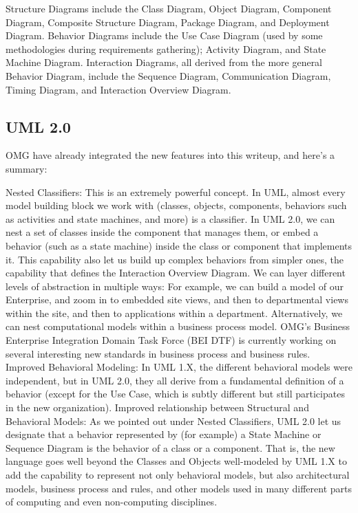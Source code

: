 Structure Diagrams include the Class Diagram, Object Diagram, Component Diagram, Composite Structure Diagram, Package Diagram, and Deployment Diagram. 
Behavior Diagrams include the Use Case Diagram (used by some methodologies during requirements gathering); Activity Diagram, and State Machine Diagram. 
Interaction Diagrams, all derived from the more general Behavior Diagram, include the Sequence Diagram, Communication Diagram, Timing Diagram, and 
Interaction Overview Diagram.

\subsection{UML 2.0}
\label{subsec:subsec01}
OMG have already integrated the new features into this writeup, and here's a summary: 

Nested Classifiers: This is an extremely powerful concept. In UML, almost every model building block we work with (classes, objects, components, 
behaviors such as activities and state machines, and more) is a classifier. In UML 2.0, we can nest a set of classes inside the component that manages 
them, or embed a behavior (such as a state machine) inside the class or component that implements it. This capability also let us build up complex behaviors 
from simpler ones, the capability that defines the Interaction Overview Diagram. We can layer different levels of abstraction in multiple ways: 
For example, we can build a model of our Enterprise, and zoom in to embedded site views, and then to departmental views within the site, 
and then to applications within a department. Alternatively, we can nest computational models within a business process model. 
OMG's Business Enterprise Integration Domain Task Force (BEI DTF) is currently working on several interesting new standards in business process 
and business rules. 
Improved Behavioral Modeling: In UML 1.X, the different behavioral models were independent, but in UML 2.0, they all derive from a fundamental 
definition of a behavior (except for the Use Case, which is subtly different but still participates in the new organization). 
Improved relationship between Structural and Behavioral Models: As we pointed out under Nested Classifiers, UML 2.0 let us designate that a behavior 
represented by (for example) a State Machine or Sequence Diagram is the behavior of a class or a component. 
That is, the new language goes well beyond the Classes and Objects well-modeled by UML 1.X to add the capability to represent not 
only behavioral models, but also architectural models, business process and rules, and other models used in many different parts of computing and
 even non-computing disciplines. 

